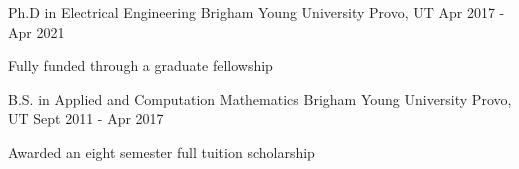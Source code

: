 

\begin{cventries}

  \cventry
    {Ph.D in Electrical Engineering} %
    {Brigham Young University} %
    {Provo, UT} %
    {Apr 2017 - Apr 2021} %
    {
      \begin{cvitems}
        \item {Fully funded through a graduate fellowship}
      \end{cvitems}
    }

  \cventry
    {B.S. in Applied and Computation Mathematics} %
    {Brigham Young University} %
    {Provo, UT} %
    {Sept 2011 - Apr 2017} %
    {
      \begin{cvitems} %
        \item {Awarded an eight semester full tuition scholarship}
      \end{cvitems}
    }

\end{cventries}
